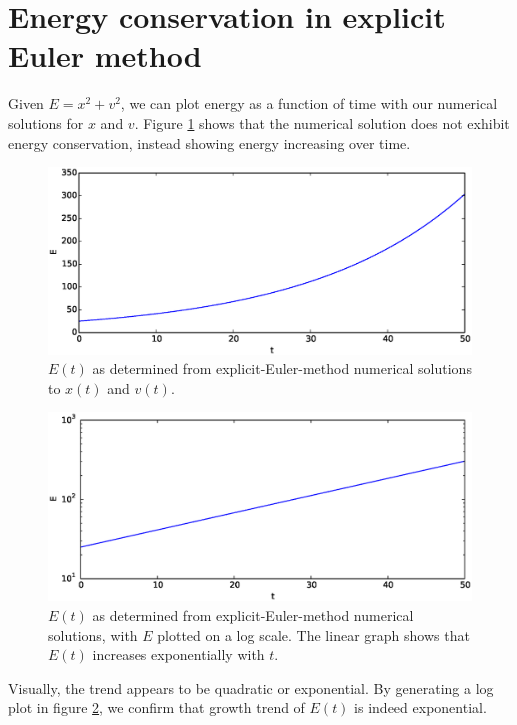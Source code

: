 \documentclass{article}
\theoremstyle{definition}
\renewcommand{\>}{\rangle}
\newcommand{\<}{\langle}
\begin{document}
\section{Energy conservation in explicit Euler method}

Given $E=x^2+v^2$, we can plot energy as a function of time with our
numerical solutions for $x$ and $v$. Figure \ref{fig:explicit_E} shows
that the numerical solution does not exhibit energy conservation, instead
showing energy increasing over time.

\begin{figure}
\includegraphics[width=\textwidth]{explicit_E.eps}
\caption{\label{fig:explicit_E}$E(t)$ as determined from explicit-Euler-method numerical
solutions to $x(t)$ and $v(t)$.}
\end{figure}

\begin{figure}
\includegraphics[width=\textwidth]{explicit_E_log.eps}
\caption{\label{fig:explicit_E_log}$E(t)$ as determined from explicit-Euler-method numerical
solutions, with $E$ plotted on a log scale. The linear graph shows that $E(t)$ increases
exponentially with $t$.}
\end{figure}

Visually, the trend appears to be quadratic or exponential. By generating
a log plot in figure \ref{fig:explicit_E_log}, we confirm that growth trend of $E(t)$ is
indeed exponential.
\end{document}
